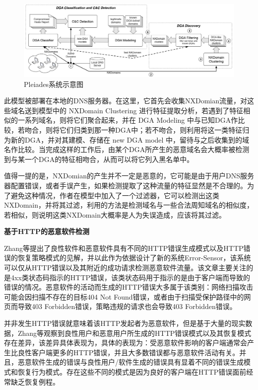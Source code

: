 \documentclass[12pt]{article} %
\begin{document}
\begin{figure}
	\caption{Pleiades系统示意图}
	\label{dga_pic}
	\includegraphics[width = \linewidth]{./pics/dga}
\end{figure}

此模型被部署在本地的DNS服务器。在这里，它首先会收集NXDomian流量，对这些域名送到模型中的 NXDomain Clustering 进行特征提取分析，若遇到了特征相似的一系列域名，则将它们聚合起来，并在 DGA Modeling 中与已知DGA作比较，若吻合，则将它们归类到那一种DGA中；若不吻合，则利用将这一类特征归为新的DGA，并对其建模、存储在 new DGA model 中，留待与之后收集到的域名作比较。当完成这样的工作后，由某个DGA所产生的恶意域名会大概率被检测到与某一个DGA的特征相吻合，从而可以将它列入黑名单中。

值得一提的是，NXDomian的产生并不一定是恶意的，它可能是由于用户DNS服务器配置错误，或者手误产生，如果检测提取了这种流量的特征显然是不合理的。为了避免这种情况，作者在模型中加入了一个过滤器，它可以检测出这类NXDomain，并将其过滤，利用的方法是检测域名与一些合法周知域名的相似度，若相似，则说明这类NXDomain大概率是人为失误造成，应该将其过滤。

\textbf{基于HTTP的恶意软件检测}

Zhang等提出了良性软件和恶意软件具有不同的HTTP错误生成模式以及HTTP错误的恢复策略模式的见解，并以此作为依据设计了新的系统Error-Sensor，该系统可以仅从HTTP错误以及其附近的成功请求检测恶意软件流量。该文章主要关注的是4xx类状态码指示的HTTP错误，该类状态码用于指示的是由于客户端而导致的错误的情况。恶意软件的活动而生成的HTTP错误大多属于该类别：网络扫描攻击可能会因扫描不存在的目标404 Not Found错误，或者由于扫描受保护路径中的网页而导致403 Forbidden错误，策略违规的请求也会导致403 Forbidden错误。

并非发生HTTP错误就意味着该HTTP发起者为恶意软件，但是基于大量的现实数据，Zhang等观察到良性用户和恶意用户所生成的HTTP错误模式以及其恢复模式存在差异，该差异具体表现为，具体的表现为：受恶意软件影响的客户端通常会产生比良性客户端更多的HTTP错误，并且大多数错误都与恶意软件活动有关。并且，恶意软件生成的错误与良性用户/软件生成的错误具有显着不同的错误生成模式和恢复行为模式。存在这些不同的模式是因为良好的客户端在HTTP错误面前经常缺乏恢复例程。
\end{document}
